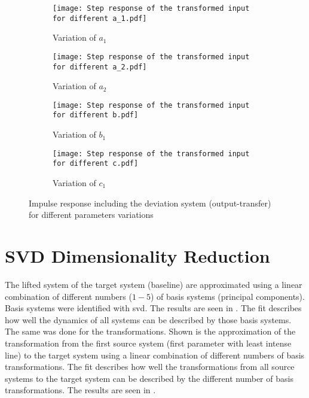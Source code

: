 \begin{figure}
    \centering
    \begin{subfigure}[t]{0.495\textwidth}
        \centering
        \texttt{[image: Step response of the transformed input for different a\_1.pdf]}
        \caption{Variation of $a_1$}
    \end{subfigure}
    \hfill
    \begin{subfigure}[t]{0.495\textwidth}
        \centering
        \texttt{[image: Step response of the transformed input for different a\_2.pdf]}
        \caption{Variation of $a_2$}
    \end{subfigure}
    
    \begin{subfigure}[t]{0.495\textwidth}
        \centering
        \texttt{[image: Step response of the transformed input for different b.pdf]}
        \caption{Variation of $b_1$}
    \end{subfigure}
    \hfill
    \begin{subfigure}[t]{0.495\textwidth}
        \centering
        \texttt{[image: Step response of the transformed input for different c.pdf]}
        \caption{Variation of $c_1$}
    \end{subfigure}
    \caption[Parameter Variations -- Impulse Response with Output Transfer]{Impulse response including the deviation system (output-transfer) for different parameters variations}
    \label{fig:app_step_res_transfer}
\end{figure}


\section{SVD Dimensionality Reduction}\label{app:svd_dim_red}
The lifted system of the target system (baseline) are approximated using a linear combination of different numbers ($1-5$) of basis systems (principal components). Basis systems were identified with \gls{svd}. The results are seen in . The fit describes how well the dynamics of all systems can be described by those basis systems.\\
The same was done for the transformations. Shown is the approximation of the transformation from the first source system (first parameter with least intense line) to the target system using a linear combination of different numbers of basis transformations. The fit describes how well the transformations from all source systems to the target system can be described by the different number of basis transformations. The results are seen in .

